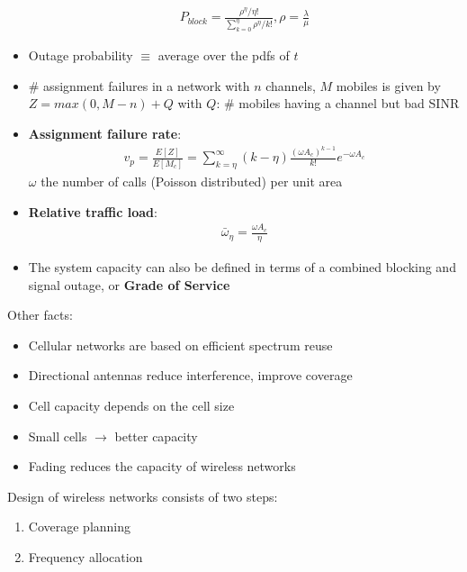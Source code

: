 \begin{itemize}
	\begin{align*}
		P_{block} = \frac{\rho^{\eta} / \eta!}{\sum_{k=0}^{\eta} \rho^{\eta}/k!}, \rho = \frac{\lambda}{\mu}
	\end{align*}
	\item Outage probability  $\equiv$ average over the pdfs of $t$
	\item \# assignment failures in a network with $n$ channels, $M$ mobiles is given by $Z = max(0, M-n) + Q$ with $Q$: \# mobiles having a channel but bad SINR
	\item \textbf{Assignment failure rate}:
	\begin{align*}
		v_p = \frac{E[Z]}{E[M_c]} = \sum_{k = \eta}^{\infty} (k - \eta) \frac{(\omega A_c)^{k-1}}{k!} e^{- \omega A_c}
	\end{align*}
	$\omega$ the number of calls (Poisson distributed) per unit area
	\item \textbf{Relative traffic load}:
	\begin{align*}
		\bar{\omega}_{\eta} = \frac{\omega A_c}{\eta}
	\end{align*}
	\item The system capacity can also be defined in terms of a combined blocking and signal outage, or \textbf{Grade of Service}
\end{itemize}

Other facts:
\begin{itemize}
	\item Cellular networks are based on efficient spectrum reuse
	\item Directional antennas reduce interference, improve coverage
	\item Cell capacity depends on the cell size 
	\item Small cells $\rightarrow$ better capacity
	\item Fading reduces the capacity of wireless networks
\end{itemize}

\begin{notImportant}
Design of wireless networks consists of two steps:
\begin{enumerate}
	\item Coverage planning
	\item Frequency allocation
\end{enumerate}
\end{notImportant}
